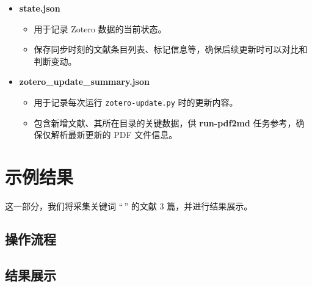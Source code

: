 \documentclass[
  letterpaper,
  DIV=11,
  numbers=noendperiod]{scrreprt}
\providecommand{\tightlist}{%
  \setlength{\itemsep}{0pt}\setlength{\parskip}{0pt}}\usepackage{longtable,booktabs,array}
\begin{document}
\begin{itemize}
\tightlist
\item
  \textbf{state.json}

  \begin{itemize}
  \tightlist
  \item
    用于记录 Zotero 数据的当前状态。\\
  \item
    保存同步时刻的文献条目列表、标记信息等，确保后续更新时可以对比和判断变动。
  \end{itemize}
\item
  \textbf{zotero\_update\_summary.json}

  \begin{itemize}
  \tightlist
  \item
    用于记录每次运行 \texttt{zotero-update.py} 时的更新内容。\\
  \item
    包含新增文献、其所在目录的关键数据，供 \textbf{run-pdf2md}
    任务参考，确保仅解析最新更新的 PDF 文件信息。
  \end{itemize}
\end{itemize}


\chapter{示例结果}\label{ux793aux4f8bux7ed3ux679c}

这一部分，我们将采集关键词 ``\,'' 的文献 3 篇，并进行结果展示。

\section{操作流程}\label{ux64cdux4f5cux6d41ux7a0b}

\section{结果展示}\label{ux7ed3ux679cux5c55ux793a}
\end{document}
